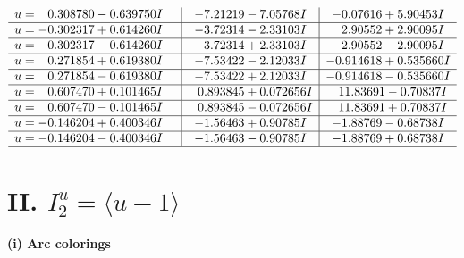 \documentclass[1p]{elsarticle_modified}
\theoremstyle{definition}
\begin{document}
$$\begin{array}{c|c|c}
\begin{aligned}
u &= \phantom{-}0.308780 - 0.639750 I\end{aligned}
 & -7.21219 - 7.05768 I & -0.07616 + 5.90453 I \\ \hline\begin{aligned}
u &= -0.302317 + 0.614260 I\end{aligned}
 & -3.72314 - 2.33103 I & \phantom{-}2.90552 + 2.90095 I \\ \hline\begin{aligned}
u &= -0.302317 - 0.614260 I\end{aligned}
 & -3.72314 + 2.33103 I & \phantom{-}2.90552 - 2.90095 I \\ \hline\begin{aligned}
u &= \phantom{-}0.271854 + 0.619380 I\end{aligned}
 & -7.53422 - 2.12033 I & -0.914618 + 0.535660 I \\ \hline\begin{aligned}
u &= \phantom{-}0.271854 - 0.619380 I\end{aligned}
 & -7.53422 + 2.12033 I & -0.914618 - 0.535660 I \\ \hline\begin{aligned}
u &= \phantom{-}0.607470 + 0.101465 I\end{aligned}
 & \phantom{-}0.893845 + 0.072656 I & \phantom{-}11.83691 - 0.70837 I \\ \hline\begin{aligned}
u &= \phantom{-}0.607470 - 0.101465 I\end{aligned}
 & \phantom{-}0.893845 - 0.072656 I & \phantom{-}11.83691 + 0.70837 I \\ \hline\begin{aligned}
u &= -0.146204 + 0.400346 I\end{aligned}
 & -1.56463 + 0.90785 I & -1.88769 - 0.68738 I \\ \hline\begin{aligned}
u &= -0.146204 - 0.400346 I\end{aligned}
 & -1.56463 - 0.90785 I & -1.88769 + 0.68738 I\\
 \hline 
 \end{array}$$\newpage\newpage\renewcommand{\arraystretch}{1}
\centering \section*{II. $I^u_{2}= \langle u-1 \rangle$}
\flushleft \textbf{(i) Arc colorings}\\
\end{document}

